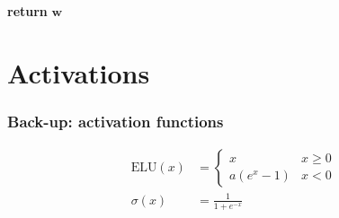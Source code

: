 \documentclass[xcolor=table,8pt]{beamer}
\begin{document}
\begin{frame}[t]
\begin{algorithm}[H]
\begin{algorithmic}[1]
{                \State \textbf{return} \( \boldsymbol{w} \)
                \EndProcedure
                }
            \end{algorithmic}
        \end{algorithm}
    \end{frame}
    
    
    \section{Activations}
    \begin{frame}[t]
        \frametitle{Back-up: activation functions}
        
        \begin{align*}
            \text{ELU}(x)
            &=
            \begin{cases}
                x   &   x \ge 0 \\
                a(e^{x}-1)  &   x < 0
            \end{cases}
            \\
            \sigma(x)
            &=
            \frac{1}{1 + e^{-x}}
        \end{align*}
        

\end{frame}
\end{document}
